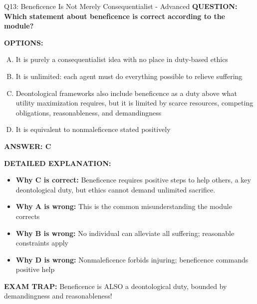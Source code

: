 \documentclass[8pt]{beamer}
\begin{document}
\begin{frame}[shrink=6]{Q13: Beneficence Is Not Merely Consequentialist - Advanced}
\fontsize{6.5}{7.5}\selectfont
\textbf{QUESTION: Which statement about beneficence is correct according to the module?}

\vspace{0.1cm}
\textbf{OPTIONS:}
\begin{enumerate}[A.]
\item It is purely a consequentialist idea with no place in duty-based ethics
\item It is unlimited: each agent must do everything possible to relieve suffering
\item Deontological frameworks also include beneficence as a duty above what utility maximization requires, but it is limited by scarce resources, competing obligations, reasonableness, and demandingness
\item It is equivalent to nonmaleficence stated positively
\end{enumerate}

\vspace{0.1cm}
\textcolor{myblue}{\textbf{ANSWER: C}}

\vspace{0.1cm}
\textbf{DETAILED EXPLANATION:}
\begin{itemize}
\item \textbf{Why C is correct:} Beneficence requires positive steps to help others, a key deontological duty, but ethics cannot demand unlimited sacrifice.
\item \textbf{Why A is wrong:} This is the common misunderstanding the module corrects
\item \textbf{Why B is wrong:} No individual can alleviate all suffering; reasonable constraints apply
\item \textbf{Why D is wrong:} Nonmaleficence forbids injuring; beneficence commands positive help
\end{itemize}

\textcolor{myred}{\textbf{EXAM TRAP:}} Beneficence is ALSO a deontological duty, bounded by demandingness and reasonableness!
\end{frame}
\end{document}
